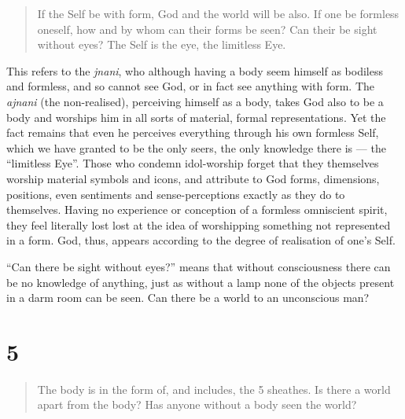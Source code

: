 \documentclass[12pt]{report}
\begin{document}
\begin{quote}
If the Self be with form, God and the world will be also. If one be
formless oneself, how and by whom can their forms be seen? Can their
be sight without eyes? The Self is the eye, the limitless Eye.
\end{quote}


This refers to the \emph{jnani}, who although having a body seem
himself as bodiless and formless, and so cannot see God, or in fact
see anything with form. The \emph{ajnani} (the non-realised),
perceiving himself as a body, takes God also to be a body and worships
him in all sorts of material, formal representations. Yet the fact
remains that even he perceives everything through his own formless
Self, which we have granted to be the only seers, the only knowledge
there is --- the ``limitless Eye''. Those who condemn idol-worship
forget that they themselves worship material symbols and icons, and
attribute to God forms, dimensions, positions, even sentiments and
sense-perceptions exactly as they do to themselves. Having no
experience or conception of a formless omniscient spirit, they feel
literally lost lost at the idea of worshipping something not
represented in a form. God, thus, appears according to the degree of
realisation of one's Self.

``Can there be sight without eyes?'' means that without consciousness
there can be no knowledge of anything, just as without a lamp none of
the objects present in a darm room can be seen. Can there be a world
to an unconscious man?

\section*{5}

\begin{quote}
The body is in the form of, and includes, the 5 sheathes. Is there a
world apart from the body? Has anyone without a body seen the world?
\end{quote}

\end{document}
